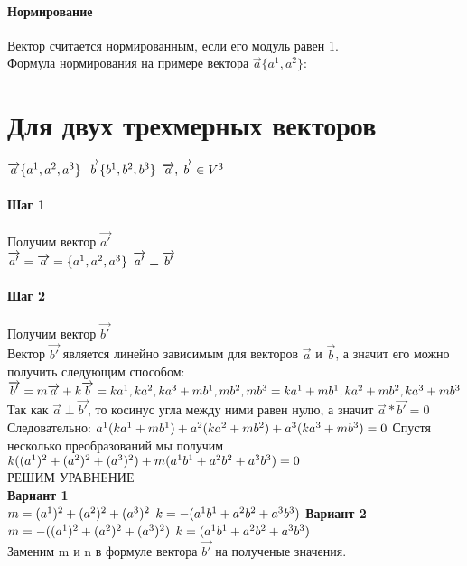 \documentclass{book}
\begin{document}
\paragraph*{Нормирование}
Вектор считается нормированным, если его модуль равен 1.\\
Формула нормирования на примере вектора $\overrightarrow{a}\{a^1,a^2\}$:
\section{Для двух трехмерных векторов}
$\overrightarrow{a}\{a^1,a^2,a^3\}\\$
$\overrightarrow{b}\{b^1,b^2,b^3\}\\$
$\overrightarrow{a},\overrightarrow{b} \in V^3\\$
\paragraph*{Шаг 1}
Получим вектор $\overrightarrow{a'}$\\
$\overrightarrow{a'}=\overrightarrow{a}=\{a^1,a^2,a^3\}\\$
$\overrightarrow{a'}\perp\overrightarrow{b'}\\$
\paragraph*{Шаг 2}
Получим вектор $\overrightarrow{b'}$\\
Вектор $\overrightarrow{b'}$ является линейно зависимым для векторов $\overrightarrow{a}$ и $\overrightarrow{b}$, а значит его можно получить следующим способом:\\
$\overrightarrow{b'}=m\overrightarrow{a}+k\overrightarrow{b}={ka^1,ka^2,ka^3}+{mb^1,mb^2,mb^3}={ka^1+mb^1,ka^2+mb^2,ka^3+mb^3}\\$
Так как $\overrightarrow{a}\perp\overrightarrow{b'}$, то косинус угла между ними равен нулю, а значит $\overrightarrow{a}*\overrightarrow{b'}=0$\\
Следовательно: $a^1(ka^1+mb^1)+a^2(ka^2+mb^2)+a^3(ka^3+mb^3)=0\\$
Спустя несколько преобразований мы получим $k((a^1)^2+(a^2)^2+(a^3)^2)+m(a^1b^1+a^2b^2+a^3b^3)=0\\$\\
РЕШИМ УРАВНЕНИЕ\\
\textbf{Вариант 1}\\
$m=(a^1)^2+(a^2)^2+(a^3)^2\\$
$k=-(a^1b^1+a^2b^2+a^3b^3)\\$
\textbf{Вариант 2}\\
$m=-((a^1)^2+(a^2)^2+(a^3)^2)\\$
$k=(a^1b^1+a^2b^2+a^3b^3)\\$
\\
Заменим m и n в формуле вектора $\overrightarrow{b'}$ на полученые значения.
\end{document}

